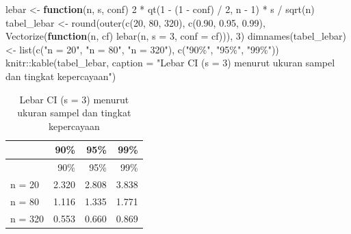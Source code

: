 \documentclass[
  indonesian,
  letterpaper,
]{book}
\newenvironment{Shaded}{\begin{snugshade}}{\end{snugshade}}
\newcommand{\AttributeTok}[1]{\textcolor[rgb]{0.40,0.45,0.13}{#1}}
\newcommand{\ControlFlowTok}[1]{\textcolor[rgb]{0.00,0.23,0.31}{\textbf{#1}}}
\newcommand{\DecValTok}[1]{\textcolor[rgb]{0.68,0.00,0.00}{#1}}
\newcommand{\FloatTok}[1]{\textcolor[rgb]{0.68,0.00,0.00}{#1}}
\newcommand{\FunctionTok}[1]{\textcolor[rgb]{0.28,0.35,0.67}{#1}}
\newcommand{\NormalTok}[1]{\textcolor[rgb]{0.00,0.23,0.31}{#1}}
\newcommand{\OtherTok}[1]{\textcolor[rgb]{0.00,0.23,0.31}{#1}}
\newcommand{\SpecialCharTok}[1]{\textcolor[rgb]{0.37,0.37,0.37}{#1}}
\newcommand{\StringTok}[1]{\textcolor[rgb]{0.13,0.47,0.30}{#1}}
\begin{document}
\begin{Shaded}
\begin{Highlighting}[]
\NormalTok{lebar }\OtherTok{\textless{}{-}} \ControlFlowTok{function}\NormalTok{(n, s, conf) }\DecValTok{2} \SpecialCharTok{*} \FunctionTok{qt}\NormalTok{(}\DecValTok{1} \SpecialCharTok{{-}}\NormalTok{ (}\DecValTok{1} \SpecialCharTok{{-}}\NormalTok{ conf) }\SpecialCharTok{/} \DecValTok{2}\NormalTok{, n }\SpecialCharTok{{-}} \DecValTok{1}\NormalTok{) }\SpecialCharTok{*}\NormalTok{ s }\SpecialCharTok{/} \FunctionTok{sqrt}\NormalTok{(n)}
\NormalTok{tabel\_lebar }\OtherTok{\textless{}{-}} \FunctionTok{round}\NormalTok{(}\FunctionTok{outer}\NormalTok{(}\FunctionTok{c}\NormalTok{(}\DecValTok{20}\NormalTok{, }\DecValTok{80}\NormalTok{, }\DecValTok{320}\NormalTok{), }\FunctionTok{c}\NormalTok{(}\FloatTok{0.90}\NormalTok{, }\FloatTok{0.95}\NormalTok{, }\FloatTok{0.99}\NormalTok{),}
                           \FunctionTok{Vectorize}\NormalTok{(}\ControlFlowTok{function}\NormalTok{(n, cf) }\FunctionTok{lebar}\NormalTok{(n, }\AttributeTok{s =} \DecValTok{3}\NormalTok{, }\AttributeTok{conf =}\NormalTok{ cf))), }\DecValTok{3}\NormalTok{)}
\FunctionTok{dimnames}\NormalTok{(tabel\_lebar) }\OtherTok{\textless{}{-}} \FunctionTok{list}\NormalTok{(}\FunctionTok{c}\NormalTok{(}\StringTok{"n = 20"}\NormalTok{, }\StringTok{"n = 80"}\NormalTok{, }\StringTok{"n = 320"}\NormalTok{), }\FunctionTok{c}\NormalTok{(}\StringTok{"90\%"}\NormalTok{, }\StringTok{"95\%"}\NormalTok{, }\StringTok{"99\%"}\NormalTok{))}
\NormalTok{knitr}\SpecialCharTok{::}\FunctionTok{kable}\NormalTok{(tabel\_lebar, }\AttributeTok{caption =} \StringTok{"Lebar CI (s = 3) menurut ukuran sampel dan tingkat kepercayaan"}\NormalTok{)}
\end{Highlighting}
\end{Shaded}

\begin{longtable}[]{@{}lrrr@{}}
\caption{Lebar CI (s = 3) menurut ukuran sampel dan tingkat
kepercayaan}\tabularnewline
\toprule\noalign{}
& 90\% & 95\% & 99\% \\
\midrule\noalign{}
\endfirsthead
\toprule\noalign{}
& 90\% & 95\% & 99\% \\
\midrule\noalign{}
\endhead
\bottomrule\noalign{}
\endlastfoot
n = 20 & 2.320 & 2.808 & 3.838 \\
n = 80 & 1.116 & 1.335 & 1.771 \\
n = 320 & 0.553 & 0.660 & 0.869 \\
\end{longtable}
\end{document}
